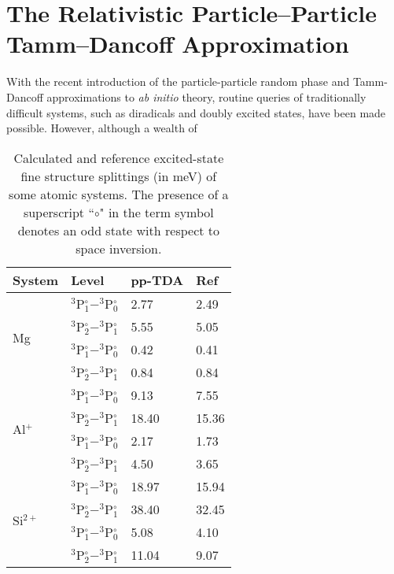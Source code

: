\linespread{1.0}
\section{The Relativistic Particle--Particle Tamm--Dancoff Approximation}
\linespread{1.5}
\label{sec:pp-X2C}

With the recent introduction of the particle-particle random phase and
Tamm-Dancoff approximations to \emph{ab initio} theory, routine queries of
traditionally difficult systems, such as diradicals and doubly excited states,
have been made possible. However, although a wealth of 
\begin{wraptable}{r}{0.45\textwidth}
  \vspace{-0.5cm}
  \caption{\footnotesize Calculated and reference\cite{NIST_ASD} excited-state fine structure
  splittings (in meV) of some atomic systems. The presence of a superscript
  ``$\circ$" in the term symbol denotes an odd state with respect to space
  inversion.}
 \vspace{-0.3cm}
 \label{tb:SingleEx}
 \centering
 \begin{tabular}{llll}
 System                    & Level                              & pp-TDA & Ref\\
 \hline
 \multirow{4}{*}{Mg}        & $^3$P$^\circ_{1}-^3$P$^\circ_{0}$  & 2.77  & 2.49 \\
                            & $^3$P$^\circ_{2}-^3$P$^\circ_{1}$  & 5.55  & 5.05 \\
                            & $^3$P$^\circ_{1}-^3$P$^\circ_{0}$  & 0.42  & 0.41 \\
                            & $^3$P$^\circ_{2}-^3$P$^\circ_{1}$  & 0.84  & 0.84 \\
 \hline
 \multirow{4}{*}{Al$^+$}    & $^3$P$^\circ_{1}-^3$P$^\circ_{0}$  & 9.13   & 7.55  \\
                            & $^3$P$^\circ_{2}-^3$P$^\circ_{1}$  & 18.40  & 15.36 \\
                            & $^3$P$^\circ_{1}-^3$P$^\circ_{0}$  & 2.17   & 1.73  \\
                            & $^3$P$^\circ_{2}-^3$P$^\circ_{1}$  & 4.50   & 3.65  \\
 \hline
 \multirow{4}{*}{Si$^{2+}$} & $^3$P$^\circ_{1}-^3$P$^\circ_{0}$  & 18.97  & 15.94 \\
                            & $^3$P$^\circ_{2}-^3$P$^\circ_{1}$  & 38.40  & 32.45 \\
                            & $^3$P$^\circ_{1}-^3$P$^\circ_{0}$  & 5.08   & 4.10  \\
                            & $^3$P$^\circ_{2}-^3$P$^\circ_{1}$  & 11.04  & 9.07  \\
 \hline
 \end{tabular}
 \vspace{-0.5cm}
\end{wraptable}
